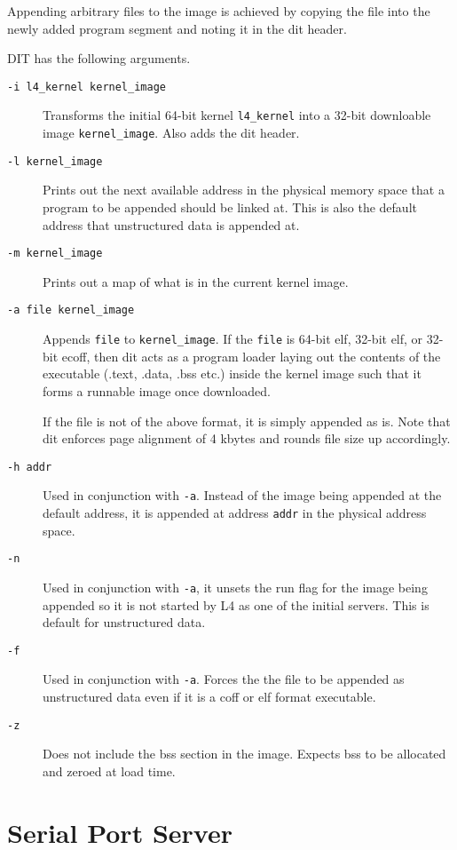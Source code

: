 \documentclass[a4paper,11pt,twoside,dvips]{book}
\begin{document}
Appending arbitrary files to the image is achieved by copying the file
into the newly added program segment and noting it in the dit header.

DIT has the following arguments.
\begin{description}
\item[\texttt{-i l4\_kernel kernel\_image}] Transforms the initial
  64-bit kernel \texttt{l4\_kernel} into a 32-bit downloable image
  \texttt{kernel\_image}. Also adds the dit header.
\item[\texttt{-l kernel\_image}] Prints out the next available address
  in the physical memory space that a program to be appended should be
  linked at. This is also the default address that unstructured data is
  appended at.
\item[\texttt{-m kernel\_image}] Prints out a map of what is in the
  current kernel image.
\item[\texttt{-a file kernel\_image}] Appends \texttt{file} to
  \texttt{kernel\_image}. If the \texttt{file} is 64-bit elf, 32-bit
  elf, or 32-bit ecoff, then dit acts as a program loader laying out the
  contents of the executable (.text, .data, .bss etc.) inside the kernel
  image such that it forms a runnable image once downloaded.

  If the file is not of the above format, it is simply appended as is.
  Note that dit enforces page alignment of 4 kbytes and rounds file size
  up accordingly.
\item[\texttt{-h addr}] Used in conjunction with \texttt{-a}. Instead of
  the image being appended at the default address, it is appended at
  address \texttt{addr} in the physical address space.
\item[\texttt{-n}] Used in conjunction with \texttt{-a}, it unsets the
  run flag for the image being appended so it is not started by L4 as
  one of the initial servers. This is default for unstructured data.
\item[\texttt{-f}] Used in conjunction with \texttt{-a}. Forces the the
  file to be appended as unstructured data even if it is a coff or elf
  format executable.
\item[\texttt{-z}] Does not include the bss section in the
image. Expects bss to be allocated and zeroed at load time.
\end{description}
 
\chapter{Serial Port Server}
\end{document}
